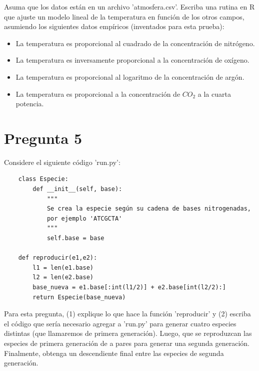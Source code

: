 \documentclass{article}
\begin{document}
Asuma que los datos están en un archivo 'atmosfera.csv'. Escriba una rutina en R que ajuste un modelo lineal de la temperatura en función de los otros campos, asumiendo los siguientes datos empíricos (inventados para esta prueba): 
    \begin{itemize}
        \item La temperatura es proporcional al cuadrado de la concentración de nitrógeno.
        \item La temperatura es inversamente proporcional a la concentración de oxígeno.
        \item La temperatura es proporcional al logaritmo de la concentración de argón.
        \item La temperatura es proporcional a la concentración de $CO_2$ a la cuarta potencia.
    \end{itemize}
\section*{Pregunta 5}
Considere el siguiente código 'run.py':
    \begin{verbatim}
    class Especie:
        def __init__(self, base):
            """
            Se crea la especie según su cadena de bases nitrogenadas,
            por ejemplo 'ATCGCTA'
            """
            self.base = base

    def reproducir(e1,e2):
        l1 = len(e1.base)
        l2 = len(e2.base)
        base_nueva = e1.base[:int(l1/2)] + e2.base[int(l2/2):]
        return Especie(base_nueva)
    \end{verbatim}
Para esta pregunta, (1) explique lo que hace la función 'reproducir' y (2) escriba el código que sería necesario agregar a 'run.py' para generar cuatro especies distintas (que llamaremos de primera generación). Luego, que se reproduzcan las especies de primera generación de a pares para generar una segunda generación. Finalmente, obtenga un descendiente final entre las especies de segunda generación.
\end{document}
